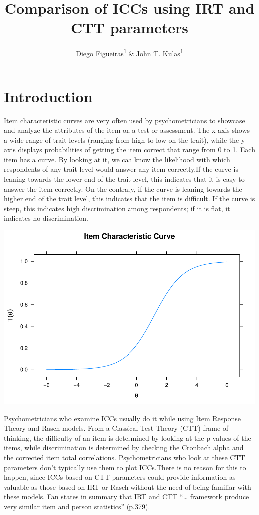 \documentclass[
  english,
  man,floatsintext]{apa6}
\title{Comparison of ICCs using IRT and CTT parameters}
\author{Diego Figueiras\textsuperscript{1} \& John T. Kulas\textsuperscript{1}}
\date{}
\affiliation{\vspace{0.5cm}\textsuperscript{1} Montclair State University}
\begin{document}
\maketitle

\hypertarget{introduction}{%
\section{Introduction}\label{introduction}}

Item characteristic curves are very often used by psychometricians to showcase and analyze the attributes of the item on a test or assessment. The x-axis shows a wide range of trait levels (ranging from high to low on the trait), while the y-axis displays probabilities of getting the item correct that range from 0 to 1. Each item has a curve. By looking at it, we can know the likelihood with which respondents of any trait level would answer any item correctly.If the curve is leaning towards the lower end of the trait level, this indicates that it is easy to answer the item correctly. On the contrary, if the curve is leaning towards the higher end of the trait level, this indicates that the item is difficult. If the curve is steep, this indicates high discrimination among respondents; if it is flat, it indicates no discrimination.

\includegraphics{papaja-test_files/figure-latex/unnamed-chunk-2-1.pdf}

Psychometricians who examine ICCs usually do it while using Item Response Theory and Rasch models. From a Classical Test Theory (CTT) frame of thinking, the difficulty of an item is determined by looking at the p-values of the items, while discrimination is determined by checking the Cronbach alpha and the corrected item total correlations. Psychometricians who look at these CTT parameters don't typically use them to plot ICCs.There is no reason for this to happen, since ICCs based on CTT parameters could provide information as valuable as those based on IRT or Rasch without the need of being familiar with these models. Fan states in summary that IRT and CTT \enquote{\ldots{} framework produce very similar item and person statistics} (p.379).
\end{document}
